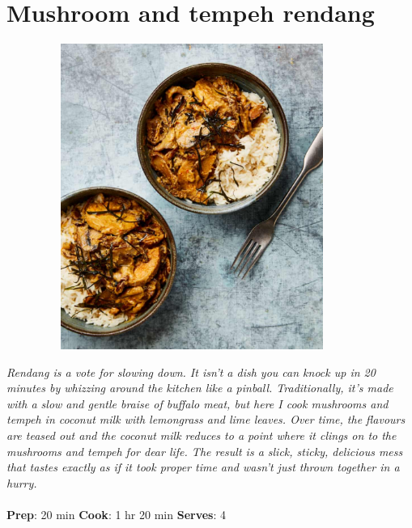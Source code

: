 \documentclass{book}
\begin{document}
\section{Mushroom and tempeh rendang}
\begin{figure}
\centering\includegraphics[width=10cm,height=10cm,keepaspectratio]{Recipe_Pictures/Mushroom_and_tempeh_rendang.png}
\end{figure}
\emph{Rendang is a vote for slowing down. It isn’t a dish you can knock up in 20 minutes by whizzing around the kitchen like a pinball. Traditionally, it’s made with a slow and gentle braise of buffalo meat, but here I cook mushrooms and tempeh in coconut milk with lemongrass and lime leaves. Over time, the flavours are teased out and the coconut milk reduces to a point where it clings on to the mushrooms and tempeh for dear life. The result is a slick, sticky, delicious mess that tastes exactly as if it took proper time and wasn’t just thrown together in a hurry.}\\\\ 
\textbf{Prep}: 20 min
\textbf{Cook}: 1 hr 20 min
\textbf{Serves}: 4
\end{document}
